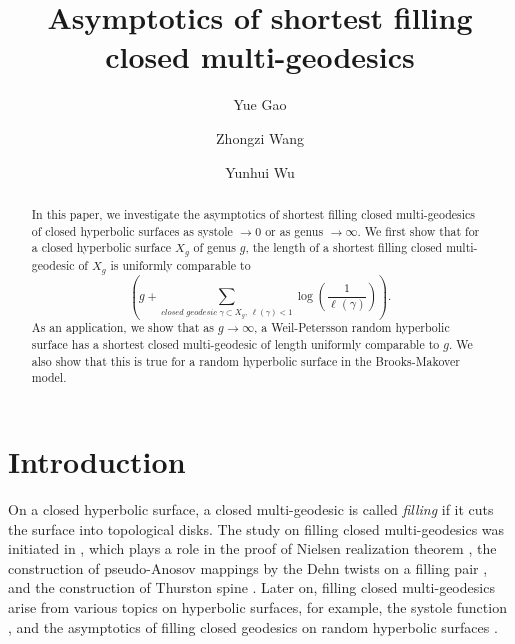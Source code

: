 \documentclass[UTF8]{amsart}
\numberwithin{equation}{section}
\theoremstyle{definition}
\theoremstyle{example}
\theoremstyle{remark}
\begin{document}

\title[Filling closed multi-geodesics]{Asymptotics of shortest filling closed multi-geodesics}

\author{Yue Gao}
\address[Y. ~G. ]{School of Mathematics and Statistics, Anhui Normal University, Wuhu, Anhui, China}

\author{Zhongzi Wang}
\address[Z. ~W. ]{School of Mathematical Sciences, Peking University, Beijing, China}

\author{Yunhui Wu}
\address[Y. ~W. ]{Tsinghua University \& BIMSA, Beijing, China}
\date{}

\maketitle


\begin{abstract}
In this paper, we investigate the asymptotics of shortest filling closed multi-geodesics of closed hyperbolic surfaces as systole $\to 0$ or as genus $\to \infty$. We first show that for a closed hyperbolic surface $X_g$ of genus $g$, the length of a shortest filling closed multi-geodesic of $X_g$ is uniformly comparable to $$\left(g+\sum\limits_{\textit{closed geodesic }\gamma\subset X_g, \ \ell(\gamma)<1}\log \left(\frac{1}{\ell(\gamma)}\right)\right).$$ As an application, we show that as $g\to \infty$, a Weil-Petersson random hyperbolic surface has a shortest closed multi-geodesic of length uniformly comparable to $g$. We also show that this is true for a random hyperbolic surface in the Brooks-Makover model. 
\end{abstract}


\tableofcontents
\section{Introduction}
On a closed hyperbolic surface, a closed multi-geodesic is called \emph{filling} if it cuts the surface into topological disks. The study on filling closed multi-geodesics was initiated in \cite{thurston1988geometry}, which plays a role in the proof of Nielsen realization theorem \cite{kerckhoff1983nielsen}, the construction of pseudo-Anosov mappings by the Dehn twists on a filling pair \cite{thurston1988geometry}, and the construction of Thurston spine \cite{thurston1986spine}. Later on, filling closed multi-geodesics arise from various topics on hyperbolic surfaces, for example, the systole function \cite{schaller1999systoles}, and the asymptotics of filling closed geodesics on random hyperbolic surfaces \cite{wu2025prime, dozier2023counting}.
\end{document}
